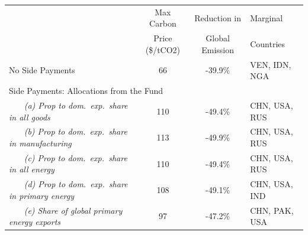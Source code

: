\begin{center}
\small
\setlength{\tabcolsep}{4pt}
\renewcommand{\arraystretch}{1.25}
\begin{tabular}{l cc l}
\hline
 & Max Carbon & Reduction in  & Marginal \\
 & Price (\$/tCO2) & Global Emission & Countries \\
\hline
 No Side Payments & 66 & -39.9\% & VEN, IDN, NGA \\
\multicolumn{4}{l}{Side Payments: Allocations from the Fund} \\
 ~~~ \textit{(a) Prop to dom.\ exp.\ share in all goods} & 110 & -49.4\% & CHN, USA, RUS \\
 ~~~ \textit{(b) Prop to dom.\ exp.\ share in manufacturing} & 113 & -49.9\% & CHN, USA, RUS \\
 ~~~ \textit{(c) Prop to dom.\ exp.\ share in all energy} & 110 & -49.4\% & CHN, USA, RUS \\
 ~~~ \textit{(d) Prop to dom.\ exp.\ share in primary energy} & 108 & -49.1\% & CHN, USA, IND \\
 ~~~ \textit{(e) Share of global primary energy exports} & 97 & -47.2\% & CHN, PAK, USA \\
\hline
\end{tabular}
\end{center}
